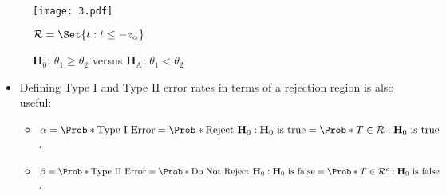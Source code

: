 \begin{figure}[!htbp]
    \centering
    \texttt{[image: 3.pdf]}
    \caption{$ \mathbf{H}_0 $: $ \theta_1\ge\theta_2 $ versus $ \mathbf{H}_\text{A} $: $ \theta_1<\theta_2 $}{$ \mathcal{R}=\Set{t\given t\le -z_{\alpha}} $}
\end{figure}
\begin{itemize}
    \item Defining Type I and Type II error rates in terms of a rejection region is also useful:
          \begin{itemize}
              \item $ \alpha=\Prob*{\text{Type I Error}}=\Prob*{\text{Reject $ \mathbf{H}_0 $}\given \text{$ \mathbf{H}_0 $ is true}}=\Prob*{T\in\mathcal{R}\given \text{$ \mathbf{H}_0 $ is true}} $.
              \item $ \beta=\Prob*{\text{Type II Error}}=\Prob*{\text{Do Not Reject $ \mathbf{H}_0 $}\given \text{$ \mathbf{H}_0 $ is false}}=\Prob*{T\in\mathcal{R}^c\given \text{$ \mathbf{H}_0 $ is false}} $.
          \end{itemize}
\end{itemize}
